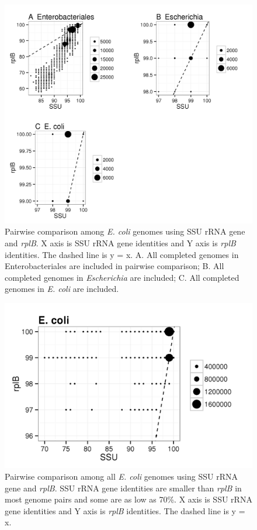 \documentclass[]{msu-thesis}
\begin{document}
\begin{figure}[tbph!]
  \centering
  \includegraphics[scale=1]{figs/E_coli}
  \caption[Pairwise comparison among \textit{E. coli} genomes using SSU rRNA gene and \textit{rplB}]{Pairwise comparison among \textit{E. coli} genomes using SSU rRNA gene and \textit{rplB}. X axis is SSU rRNA gene identities and Y axis is \textit{rplB} identities. The dashed line is y = x. A. All completed genomes in Enterobacteriales are included in pairwise comparison; B. All completed genomes in \textit{Escherichia} are included; C. All completed genomes in \textit{E. coli} are included.}
  \label{fig:EColi}
\end{figure}


\begin{figure}[tbph!]
  \centering
  \includegraphics[scale=1]{figs/E_coli_all}
  \caption[Pairwise comparison among all \textit{E. coli} genomes using SSU rRNA gene and \textit{rplB}]{Pairwise comparison among all \textit{E. coli} genomes using SSU rRNA gene and \textit{rplB}. SSU rRNA gene identities are smaller than \textit{rplB} in most genome pairs and some are as low as 70\%. X axis is SSU rRNA gene identities and Y axis is \textit{rplB} identities. The dashed line is y = x. }
  \label{fig:EColiAll}
\end{figure}
\end{document}
